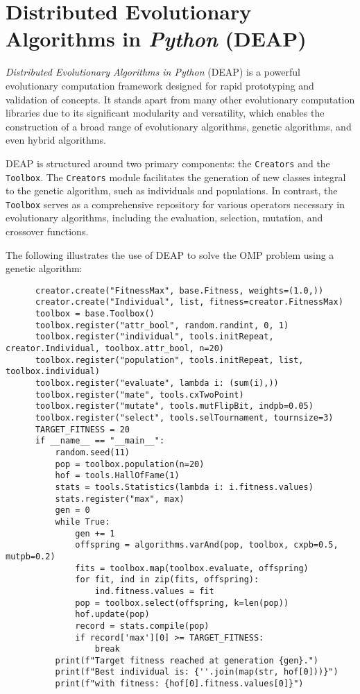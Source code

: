 \section{Distributed Evolutionary Algorithms in \textit{Python} (DEAP)}
\label{sec:sota:deap}

  \emph{Distributed Evolutionary Algorithms in Python} (DEAP) is a powerful
  evolutionary computation framework designed for rapid prototyping and
  validation of concepts.
  It stands apart from many other evolutionary computation libraries due to its
  significant modularity and versatility, which enables the construction of a
  broad range of evolutionary algorithms, genetic algorithms, and even hybrid
  algorithms.

  DEAP is structured around two primary components: the \texttt{Creators} and
  the \texttt{Toolbox}.
  The \texttt{Creators} module facilitates the generation of new classes
  integral to the genetic algorithm, such as individuals and populations.
  In contrast, the \texttt{Toolbox} serves as a comprehensive repository for
  various operators necessary in evolutionary algorithms, including the
  evaluation, selection, mutation, and crossover functions.

  The following illustrates the use of DEAP to solve the OMP problem using a
  genetic algorithm:

  \begin{src}
    \label{src:sota:deap:example}
    \begin{verbatim}
      creator.create("FitnessMax", base.Fitness, weights=(1.0,))
      creator.create("Individual", list, fitness=creator.FitnessMax)
      toolbox = base.Toolbox()
      toolbox.register("attr_bool", random.randint, 0, 1)
      toolbox.register("individual", tools.initRepeat, creator.Individual, toolbox.attr_bool, n=20)
      toolbox.register("population", tools.initRepeat, list, toolbox.individual)
      toolbox.register("evaluate", lambda i: (sum(i),))
      toolbox.register("mate", tools.cxTwoPoint)
      toolbox.register("mutate", tools.mutFlipBit, indpb=0.05)
      toolbox.register("select", tools.selTournament, tournsize=3)
      TARGET_FITNESS = 20
      if __name__ == "__main__":
          random.seed(11)
          pop = toolbox.population(n=20)
          hof = tools.HallOfFame(1)
          stats = tools.Statistics(lambda i: i.fitness.values)
          stats.register("max", max)
          gen = 0
          while True:
              gen += 1
              offspring = algorithms.varAnd(pop, toolbox, cxpb=0.5, mutpb=0.2)
              fits = toolbox.map(toolbox.evaluate, offspring)
              for fit, ind in zip(fits, offspring):
                  ind.fitness.values = fit
              pop = toolbox.select(offspring, k=len(pop))
              hof.update(pop)
              record = stats.compile(pop)
              if record['max'][0] >= TARGET_FITNESS:
                  break
          print(f"Target fitness reached at generation {gen}.")
          print(f"Best individual is: {''.join(map(str, hof[0]))}")
          print(f"with fitness: {hof[0].fitness.values[0]}")
    \end{verbatim}
  \end{src}


